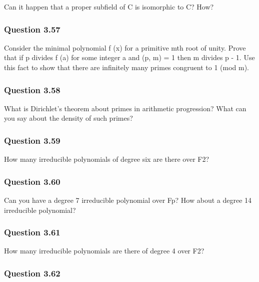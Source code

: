 Can it happen that a proper subfield of C is isomorphic to C? How?

\hypertarget{question-3.57}{%
\subsubsection{Question 3.57}\label{question-3.57}}

Consider the minimal polynomial f (x) for a primitive mth root of unity.
Prove that if p divides f (a) for some integer a and (p, m) = 1 then m
divides p - 1. Use this fact to show that there are infinitely many
primes congruent to 1 (mod m).

\hypertarget{question-3.58}{%
\subsubsection{Question 3.58}\label{question-3.58}}

What is Dirichlet's theorem about primes in arithmetic progression? What
can you say about the density of such primes?

\hypertarget{question-3.59}{%
\subsubsection{Question 3.59}\label{question-3.59}}

How many irreducible polynomials of degree six are there over F2?

\hypertarget{question-3.60}{%
\subsubsection{Question 3.60}\label{question-3.60}}

Can you have a degree 7 irreducible polynomial over Fp? How about a
degree 14 irreducible polynomial?

\hypertarget{question-3.61}{%
\subsubsection{Question 3.61}\label{question-3.61}}

How many irreducible polynomials are there of degree 4 over F2?

\hypertarget{question-3.62}{%
\subsubsection{Question 3.62}\label{question-3.62}}

